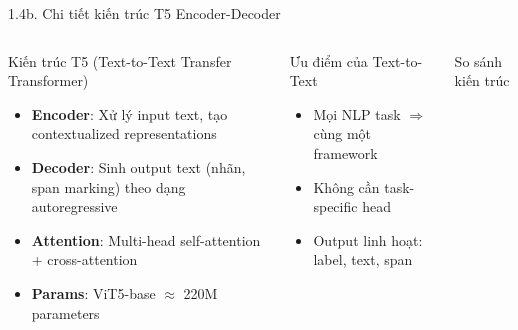 \documentclass[11pt, aspectratio=169]{beamer}
\begin{document}
\begin{frame}[fragile, shrink=10]{1.4b. Chi tiết kiến trúc T5 Encoder-Decoder}

\begin{columns}[T]
  \begin{block}{Kiến trúc T5 (Text-to-Text Transfer Transformer)}
    \begin{itemize}
      \item \textbf{Encoder}: Xử lý input text, tạo contextualized representations
      \item \textbf{Decoder}: Sinh output text (nhãn, span marking) theo dạng autoregressive
      \item \textbf{Attention}: Multi-head self-attention + cross-attention
      \item \textbf{Params}: ViT5-base $\approx$ 220M parameters
    \end{itemize}
  \end{block}

  \vspace{0.2cm}
  \begin{block}{Ưu điểm của Text-to-Text}
    \begin{itemize}
      \item Mọi NLP task $\Rightarrow$ cùng một framework
      \item Không cần task-specific head
      \item Output linh hoạt: label, text, span
    \end{itemize}
  \end{block}

  \begin{block}{So sánh kiến trúc}
    \centering
  \end{block}


\end{columns}
\end{frame}
\end{document}

